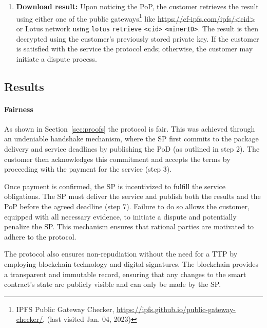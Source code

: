 \documentclass[pdftex,twocolumn,epjc3]{svjour3}
\begin{document}
\begin{enumerate}
  \item \textbf{Download result:} Upon noticing the PoP, the customer retrieves the result using either one of the public gateways\footnote{IPFS Public Gateway Checker, \url{https://ipfs.github.io/public-gateway-checker/}, (last visited Jan. 04, 2023)} like \url{https://cf-ipfs.com/ipfs/<cid>} or Lotus network using \texttt{lotus} \texttt{retrieve} \texttt{<cid>} \texttt{<minerID>}. The result is then decrypted using the customer's previously stored private key. If the customer is satisfied with the service the protocol ends; otherwise, the customer may initiate a dispute process.
  
\end{enumerate}

\subsection{Results}

\paragraph{Fairness}
As shown in Section~\ref{sec:proofs} the protocol is fair. This was achieved through an undeniable handshake mechanism, where the SP first commits to the package delivery and service deadlines by publishing the PoD (as outlined in step 2). The customer then acknowledges this commitment and accepts the terms by proceeding with the payment for the service (step 3).

Once payment is confirmed, the SP is incentivized to fulfill the service obligations. The SP must deliver the service and publish both the results and the PoP before the agreed deadline (step 7). Failure to do so allows the customer, equipped with all necessary evidence, to initiate a dispute and potentially penalize the SP. This mechanism ensures that rational parties are motivated to adhere to the protocol.

The protocol also ensures non-repudiation without the need for a TTP by employing blockchain technology and digital signatures. The blockchain provides a transparent and immutable record, ensuring that any changes to the smart contract's state are publicly visible and can only be made by the SP.
\end{document}
